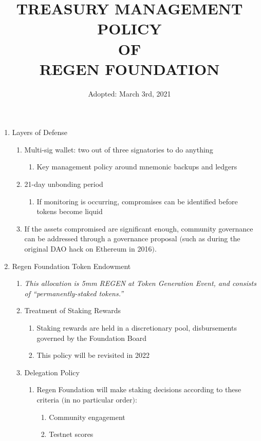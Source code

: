 \documentclass{article}
\begin{document}
\title{TREASURY MANAGEMENT POLICY \protect\\ OF \protect\\ REGEN FOUNDATION}
\author{Adopted: March 3rd, 2021}
\date{} 
\maketitle
\begin{enumerate}
\item Layers of Defense
\begin{enumerate}
\item Multi-sig wallet: two out of three signatories to do anything
\begin{enumerate}
\item Key management policy around mnemonic backups and ledgers
\end{enumerate}
\item 21-day unbonding period
\begin{enumerate}
\item If monitoring is occurring, compromises can be identified before tokens become liquid
\end{enumerate}
\item If the assets compromised are significant enough, community governance can be addressed through a governance proposal $($such as during the original DAO hack on Ethereum in 2016$)$.
\end{enumerate}
\item Regen Foundation Token Endowment
\begin{enumerate}
\item {\it This allocation is 5mm REGEN at Token Generation Event, and consists of “permanently-staked tokens.”}
\item Treatment of Staking Rewards
\begin{enumerate}
\item Staking rewards are held in a discretionary pool, disbursements governed by the Foundation Board
\item This policy will be revisited in 2022
\end{enumerate}
\item Delegation Policy
\begin{enumerate}
\item Regen Foundation will make staking decisions according to these criteria $($in no particular order$)$:
\begin{enumerate}
\item Community engagement
\item Testnet scores

\end{enumerate}
\end{enumerate}
\end{enumerate}
\end{enumerate}
\end{document}
